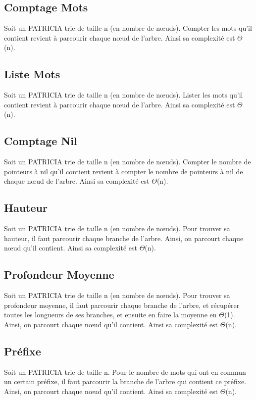 \documentclass[a4paper,12pt]{report}
\begin{document}
\subsection{Comptage Mots}
Soit un PATRICIA trie de taille n (en nombre de nœuds). Compter les mots qu'il contient revient à parcourir chaque nœud de l'arbre. Ainsi sa complexité est $\Theta$(n).

\subsection{Liste Mots}
Soit un PATRICIA trie de taille n (en nombre de nœuds). Lister les mots qu'il contient revient à parcourir chaque nœud de l'arbre. Ainsi sa complexité est $\Theta$(n).

\subsection{Comptage Nil}
Soit un PATRICIA trie de taille n (en nombre de nœuds). Compter le nombre de pointeurs à nil qu'il contient revient à compter le nombre de pointeurs à nil de chaque nœud de l'arbre. Ainsi sa complexité est $\Theta$(n).

\subsection{Hauteur}
Soit un PATRICIA trie de taille n (en nombre de nœuds). Pour trouver sa hauteur, il faut parcourir chaque branche de l'arbre. Ainsi, on parcourt chaque nœud qu'il contient. Ainsi sa complexité est $\Theta$(n).

\subsection{Profondeur Moyenne}
Soit un PATRICIA trie de taille n (en nombre de nœuds). Pour trouver sa profondeur moyenne, il faut parcourir chaque branche de l'arbre, et récupérer toutes les longueurs de ses branches, et ensuite en faire la moyenne en $\Theta$(1). Ainsi, on parcourt chaque nœud qu'il contient. Ainsi sa complexité est $\Theta$(n).

\subsection{Préfixe}
Soit un PATRICIA trie de taille n. Pour le nombre de mots qui ont en commun un certain préfixe, il faut parcourir la branche de l'arbre qui contient ce préfixe. Ainsi, on parcourt chaque nœud qu'il contient. Ainsi sa complexité est $\Theta$(n).
\end{document}

